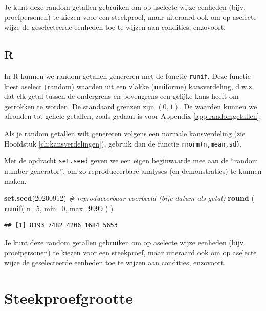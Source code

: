 \documentclass[
]{book}
\newenvironment{Shaded}{\begin{snugshade}}{\end{snugshade}}
\newcommand{\CommentTok}[1]{\textcolor[rgb]{0.56,0.35,0.01}{\textit{#1}}}
\newcommand{\DataTypeTok}[1]{\textcolor[rgb]{0.13,0.29,0.53}{#1}}
\newcommand{\DecValTok}[1]{\textcolor[rgb]{0.00,0.00,0.81}{#1}}
\newcommand{\KeywordTok}[1]{\textcolor[rgb]{0.13,0.29,0.53}{\textbf{#1}}}
\newcommand{\NormalTok}[1]{#1}
\begin{document}
Je kunt deze random getallen gebruiken om op aselecte wijze eenheden (bijv. proefpersonen) te kiezen voor een steekproef, maar uiteraard ook om op aselecte wijze de geselecteerde eenheden toe te wijzen aan condities, enzovoort.

\hypertarget{r}{%
\subsection{R}\label{r}}

In R kunnen we random getallen genereren met de functie \texttt{runif}. Deze functie kiest aselect (\textbf{r}andom) waarden uit een vlakke (\textbf{unif}orme) kansverdeling, d.w.z. dat elk getal tussen de ondergrens en bovengrens een gelijke kans heeft om getrokken te worden. De standaard grenzen zijn \((0,1)\). De waarden kunnen we afronden tot gehele getallen, zoals gedaan is voor Appendix \ref{app:randomgetallen}.

Als je random getallen wilt genereren volgens een normale kansverdeling (zie Hoofdstuk \ref{ch:kansverdelingen}), gebruik dan de functie \texttt{rnorm(n,mean,sd)}.

Met de opdracht \texttt{set.seed} geven we een eigen beginwaarde mee aan de ``random number generator'', om zo reproduceerbare analyses (en demonstraties) te kunnen maken.

\begin{Shaded}
\begin{Highlighting}[]
\KeywordTok{set.seed}\NormalTok{(}\DecValTok{20200912}\NormalTok{) }\CommentTok{\# reproduceerbaar voorbeeld (bijv datum als getal)}
\KeywordTok{round}\NormalTok{ ( }\KeywordTok{runif}\NormalTok{( }\DataTypeTok{n=}\DecValTok{5}\NormalTok{, }\DataTypeTok{min=}\DecValTok{0}\NormalTok{, }\DataTypeTok{max=}\DecValTok{9999}\NormalTok{ ) )}
\end{Highlighting}
\end{Shaded}

\begin{verbatim}
## [1] 8193 7482 4206 1684 5653
\end{verbatim}

Je kunt deze random getallen gebruiken om op aselecte wijze eenheden (bijv. proefpersonen) te kiezen voor een steekproef, maar uiteraard ook om op aselecte wijze de geselecteerde eenheden toe te wijzen aan condities, enzovoort.

\hypertarget{sec:steekproefgrootte}{%
\section{Steekproefgrootte}\label{sec:steekproefgrootte}}
\end{document}
